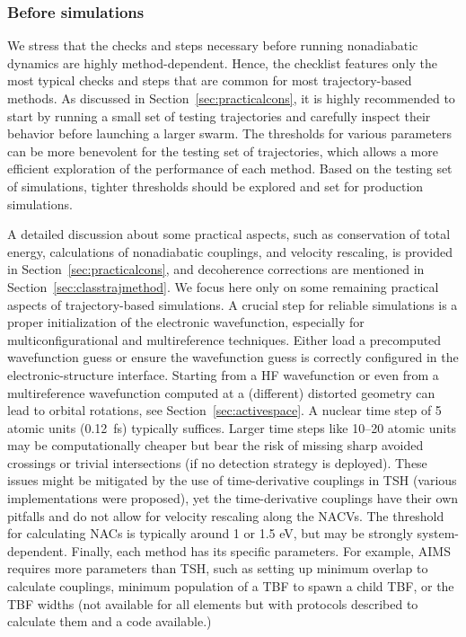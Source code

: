 \documentclass[9pt,bestpractices,pubversion]{livecoms}
\begin{document}
\subsubsection{Before simulations}
We stress that the checks and steps necessary before running nonadiabatic dynamics are highly method-dependent. Hence, the checklist features only the most typical checks and steps that are common for most trajectory-based methods. As discussed in Section~\ref{sec:practicalcons}, it is highly recommended to start by running a small set of testing trajectories and carefully inspect their behavior before launching a larger swarm. The thresholds for various parameters can be more benevolent for the testing set of trajectories, which allows a more efficient exploration of the performance of each method. Based on the testing set of simulations, tighter thresholds should be explored and set for production simulations.

A detailed discussion about some practical aspects, such as conservation of total energy, calculations of nonadiabatic couplings, and velocity rescaling, is provided in Section~\ref{sec:practicalcons}, and decoherence corrections are mentioned in Section~\ref{sec:classtrajmethod}. We focus here only on some remaining practical aspects of trajectory-based simulations. A crucial step for reliable simulations is a proper initialization of the electronic wavefunction, especially for multiconfigurational and multireference techniques. Either load a precomputed wavefunction guess or ensure the wavefunction guess is correctly configured in the electronic-structure interface. Starting from a HF wavefunction or even from a multireference wavefunction computed at a (different) distorted geometry can lead to orbital rotations, see Section~\ref{sec:activespace}. 
A nuclear time step of 5 atomic units (0.12~fs) typically suffices. Larger time steps like 10–20 atomic units may be computationally cheaper but bear the risk of missing sharp avoided crossings or trivial intersections (if no detection strategy is deployed). These issues might be mitigated by the use of time-derivative couplings in TSH (various implementations were proposed), yet the time-derivative couplings have their own pitfalls and do    not allow for velocity rescaling along the NACVs. The threshold for calculating NACs is typically around 1 or 1.5 eV, but may be strongly system-dependent.
Finally, each method has its specific parameters. For example, AIMS requires more parameters than TSH,\cite{lassmann2023} such as setting up minimum overlap to calculate couplings, minimum population of a TBF to spawn a child TBF, or the TBF widths (not available for all elements but with protocols described to calculate them\cite{THOMPSON201070width,esch2019widthlevine} and a code available.\cite{yorick_lassmann_2022_7382685})
\end{document}
